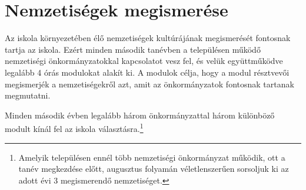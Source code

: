\section{Nemzetiségek megismerése}
\label{sec:nemzetiseg}

Az iskola környezetében élő nemzetiségek kultúrájának megismerését fontosnak tartja az iskola. Ezért minden második tanévben a településen működő nemzetiségi önkormányzatokkal kapcsolatot vesz fel, és  velük együttműködve legalább 4 órás modulokat alakít ki. A modulok célja, hogy a modul résztvevői megismerjék a nemzetiségekről azt, amit az önkormányzatok fontosnak tartanak megmutatni.

Minden második évben legalább három önkormányzattal három különböző modult kínál fel az iskola választásra.\footnote{Amelyik településen ennél több nemzetiségi önkormányzat működik, ott a tanév megkezdése előtt, augusztus folyamán véletlenszerűen sorsoljuk ki az adott évi 3 megismerendő nemzetiséget.}